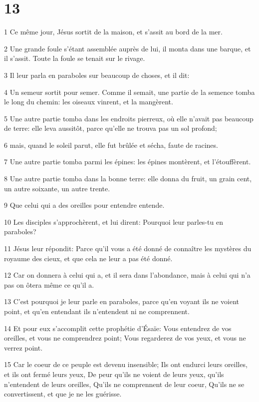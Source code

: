 \chapter{13}

\par 1 Ce même jour, Jésus sortit de la maison, et s'assit au bord de la mer.
\par 2 Une grande foule s'étant assemblée auprès de lui, il monta dans une barque, et il s'assit. Toute la foule se tenait sur le rivage.
\par 3 Il leur parla en paraboles sur beaucoup de choses, et il dit:
\par 4 Un semeur sortit pour semer. Comme il semait, une partie de la semence tomba le long du chemin: les oiseaux vinrent, et la mangèrent.
\par 5 Une autre partie tomba dans les endroits pierreux, où elle n'avait pas beaucoup de terre: elle leva aussitôt, parce qu'elle ne trouva pas un sol profond;
\par 6 mais, quand le soleil parut, elle fut brûlée et sécha, faute de racines.
\par 7 Une autre partie tomba parmi les épines: les épines montèrent, et l'étouffèrent.
\par 8 Une autre partie tomba dans la bonne terre: elle donna du fruit, un grain cent, un autre soixante, un autre trente.
\par 9 Que celui qui a des oreilles pour entendre entende.
\par 10 Les disciples s'approchèrent, et lui dirent: Pourquoi leur parles-tu en paraboles?
\par 11 Jésus leur répondit: Parce qu'il vous a été donné de connaître les mystères du royaume des cieux, et que cela ne leur a pas été donné.
\par 12 Car on donnera à celui qui a, et il sera dans l'abondance, mais à celui qui n'a pas on ôtera même ce qu'il a.
\par 13 C'est pourquoi je leur parle en paraboles, parce qu'en voyant ils ne voient point, et qu'en entendant ils n'entendent ni ne comprennent.
\par 14 Et pour eux s'accomplit cette prophétie d'Ésaïe: Vous entendrez de vos oreilles, et vous ne comprendrez point; Vous regarderez de vos yeux, et vous ne verrez point.
\par 15 Car le coeur de ce peuple est devenu insensible; Ils ont endurci leurs oreilles, et ils ont fermé leurs yeux, De peur qu'ils ne voient de leurs yeux, qu'ils n'entendent de leurs oreilles, Qu'ils ne comprennent de leur coeur, Qu'ils ne se convertissent, et que je ne les guérisse.
